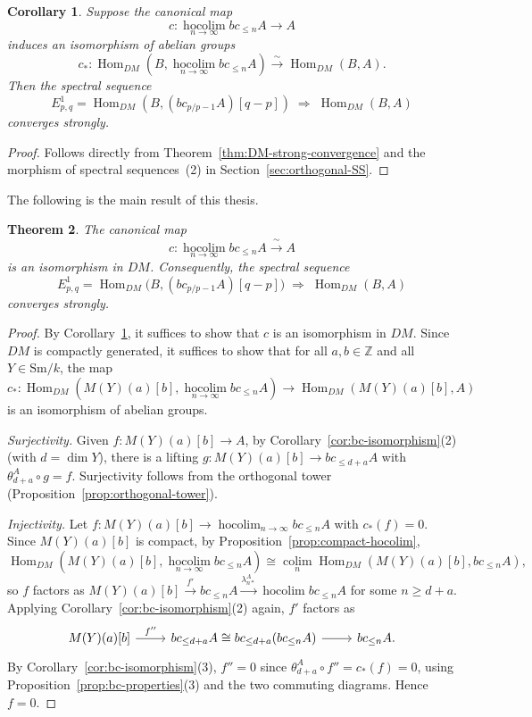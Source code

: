 \documentclass[12pt,a4paper]{article}
\newtheorem{theorem}{Theorem}[section]
\newtheorem{corollary}[theorem]{Corollary}
\theoremstyle{definition}
\newcommand{\Sm}{\mathrm{Sm}}
\newcommand{\hocolim}{\operatorname*{hocolim}}
\newcommand{\colim}{\operatorname*{colim}}
\newcommand{\Hom}{\operatorname{Hom}}
\newcommand{\Z}{\mathbb{Z}}
\begin{document}
\begin{corollary}\label{cor:hocolim-iso}
Suppose the canonical map
\[
  c:\hocolim_{n\to\infty}bc_{\leq n}A\longrightarrow A
\]
induces an isomorphism of abelian groups
\[
  c_*:\Hom_{DM}(B,\hocolim_{n\to\infty}bc_{\leq n}A)\xrightarrow{\;\sim\;}
  \Hom_{DM}(B,A).
\]
Then the spectral sequence
\[
  E^1_{p,q} = \Hom_{DM}(B,(bc_{p/p-1}A)[q-p])\;\Rightarrow\;\Hom_{DM}(B,A)
\]
converges strongly.
\end{corollary}
\begin{proof}
Follows directly from Theorem~\ref{thm:DM-strong-convergence} and the morphism of
spectral sequences~(2) in Section~\ref{sec:orthogonal-SS}.
\end{proof}

The following is the main result of this thesis.

\begin{theorem}\label{thm:main}
The canonical map
\[
  c:\hocolim_{n\to\infty}bc_{\leq n}A\xrightarrow{\;\sim\;} A
\]
is an isomorphism in $DM$.  Consequently, the spectral sequence
\[
  E^1_{p,q} = \Hom_{DM}\!\bigl(B,(bc_{p/p-1}A)[q-p]\bigr)
  \;\Rightarrow\;\Hom_{DM}(B,A)
\]
converges strongly.
\end{theorem}
\begin{proof}
By Corollary~\ref{cor:hocolim-iso}, it suffices to show that $c$ is an isomorphism in
$DM$.  Since $DM$ is compactly generated, it suffices to show that for all $a,b\in\Z$
and all $Y\in\Sm/k$, the map
\[
  c_*:\Hom_{DM}(M(Y)(a)[b],\hocolim_{n\to\infty}bc_{\leq n}A)
  \longrightarrow\Hom_{DM}(M(Y)(a)[b],A)
\]
is an isomorphism of abelian groups.

\textit{Surjectivity.}  Given $f:M(Y)(a)[b]\to A$, by Corollary~\ref{cor:bc-isomorphism}(2)
(with $d=\dim Y$), there is a lifting $g:M(Y)(a)[b]\to bc_{\leq d+a}A$ with
$\theta_{d+a}^A\circ g=f$.  Surjectivity follows from the orthogonal tower
(Proposition~\ref{prop:orthogonal-tower}).

\textit{Injectivity.}  Let $f:M(Y)(a)[b]\to\hocolim_{n\to\infty}bc_{\leq n}A$ with
$c_*(f)=0$.  Since $M(Y)(a)[b]$ is compact, by Proposition~\ref{prop:compact-hocolim},
\[
  \Hom_{DM}(M(Y)(a)[b],\hocolim_{n\to\infty}bc_{\leq n}A)
  \cong\colim_n\Hom_{DM}(M(Y)(a)[b],bc_{\leq n}A),
\]
so $f$ factors as $M(Y)(a)[b]\xrightarrow{f'} bc_{\leq n}A\xrightarrow{\lambda_{n*}^A}
\hocolim bc_{\leq n}A$ for some $n\geq d+a$.  Applying Corollary~\ref{cor:bc-isomorphism}(2)
again, $f'$ factors as
\[
\begin{tikzcd}
  M(Y)(a)[b] \ar[r,"f''"] & bc_{\leq d+a}A\cong bc_{\leq d+a}(bc_{\leq n}A)
    \ar[r] & bc_{\leq n}A.
\end{tikzcd}
\]
By Corollary~\ref{cor:bc-isomorphism}(3), $f''=0$ since
$\theta_{d+a}^A\circ f''= c_*(f)=0$, using Proposition~\ref{prop:bc-properties}(3)
and the two commuting diagrams.  Hence $f=0$.
\end{proof}
\end{document}
